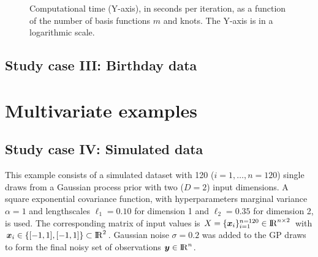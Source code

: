 \documentclass[]{interact}
\theoremstyle{plain}%
\theoremstyle{definition}
\theoremstyle{remark}
\begin{document}
\begin{figure}
\centering
{}
\caption{Computational time (Y-axis), in seconds per iteration, as a function of the number of basis functions $m$ and knots. The Y-axis is in a logarithmic scale.}
  \label{fig14_1_time_gaydata}
\end{figure}

\subsection{Study case III: Birthday data}

\vspace{5mm}
\section{Multivariate examples}
\subsection{Study case IV: Simulated data}

This example consists of a simulated dataset with 120 ($i=1,\dots,n=120$) single draws from a Gaussian process prior with two ($D=2$) input dimensions. A square exponential covariance function, with hyperparameters marginal variance $\alpha=1$ and lengthscales $\ell_1=0.10$ for dimension 1 and $\ell_2=0.35$ for dimension 2, is used. The corresponding matrix of input values is $X=\{\bm{x}_i\}_{i=1}^{n=120} \in {\rm I\!R}^{n\times 2}$ with $\bm{x}_i \in \{[-1,1],[-1,1]\} \subset {\rm I\!R}^2$. Gaussian noise $\sigma=0.2$ was added to the GP draws to form the final noisy set of observations $\bm{y} \in {\rm I\!R}^n$.
\end{document}
